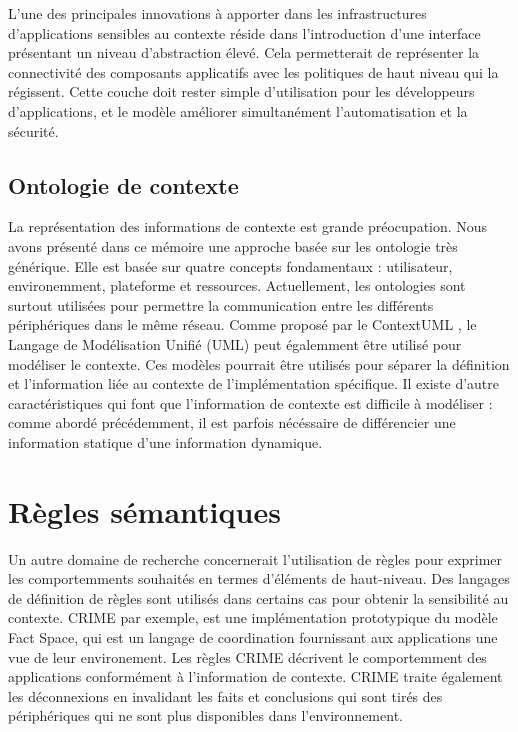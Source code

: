 L'une des principales innovations à apporter dans les infrastructures
d'applications sensibles au contexte réside dans l'introduction d'une interface
présentant un niveau d'abstraction élevé. Cela permetterait de représenter la
connectivité des composants applicatifs avec les politiques de haut niveau qui
la régissent.  Cette couche doit rester simple d'utilisation pour les
développeurs d'applications, et le modèle améliorer simultanément
l'automatisation et la sécurité.

\subsection{Ontologie de contexte}

La représentation des informations de contexte est grande préocupation. Nous
avons présenté dans ce mémoire une approche basée sur les ontologie très
générique. Elle est basée sur quatre concepts fondamentaux : utilisateur,
environemment, plateforme et ressources. Actuellement, les ontologies sont
surtout utilisées pour permettre la communication entre les différents
périphériques dans le même réseau. Comme proposé par le ContextUML
\cite{sheng_contextuml:_2005}, le Langage de Modélisation Unifié (UML) peut
égalemment être utilisé pour modéliser le contexte. Ces modèles pourrait être
utilisés pour séparer la définition et l'information liée au contexte de
l'implémentation spécifique. Il existe d'autre caractéristiques qui font que
l'information de contexte est difficile à modéliser : comme abordé précédemment,
il est parfois nécéssaire de différencier une information statique d'une
information dynamique.

\section{Règles sémantiques}

Un autre domaine de recherche concernerait l'utilisation de règles pour exprimer
les comportemments souhaités en termes d'éléments de haut-niveau. Des langages
de définition de règles sont utilisés dans certains cas pour obtenir la
sensibilité au contexte. CRIME \cite{murphy_coordination_2007} par exemple, est
une implémentation prototypique du modèle Fact Space, qui est un langage de
coordination fournissant aux applications une vue de leur environement. Les
règles CRIME décrivent le comportemment des applications conformément à
l'information de contexte. CRIME traite également les déconnexions en invalidant
les faits et conclusions qui sont tirés des périphériques qui ne sont plus
disponibles dans l'environnement.


